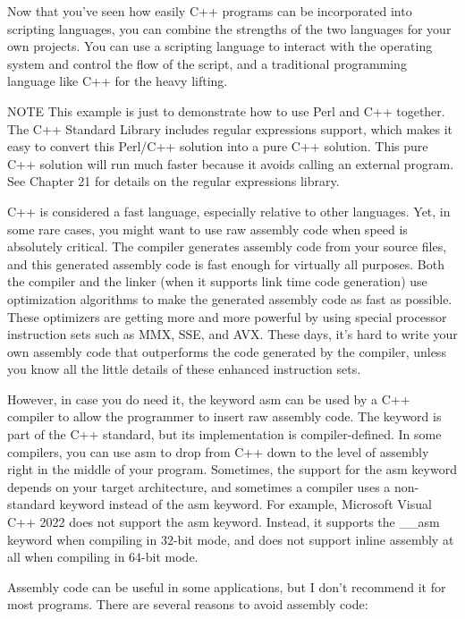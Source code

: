 Now that you’ve seen how easily C++ programs can be incorporated into scripting languages, you can combine the strengths of the two languages for your own projects. You can use a scripting language to interact with the operating system and control the flow of the script, and a traditional programming language like C++ for the heavy lifting.

\begin{myNotic}{NOTE}
This example is just to demonstrate how to use Perl and C++ together. The C++ Standard Library includes regular expressions support, which makes it easy to convert this Perl/C++ solution into a pure C++ solution. This pure C++ solution will run much faster because it avoids calling an external program. See Chapter 21 for details on the regular expressions library.
\end{myNotic}


C++ is considered a fast language, especially relative to other languages. Yet, in some rare cases, you might want to use raw assembly code when speed is absolutely critical. The compiler generates assembly code from your source files, and this generated assembly code is fast enough for virtually all purposes. Both the compiler and the linker (when it supports link time code generation) use optimization algorithms to make the generated assembly code as fast as possible. These optimizers are getting more and more powerful by using special processor instruction sets such as MMX, SSE, and AVX. These days, it’s hard to write your own assembly code that outperforms the code generated by the compiler, unless you know all the little details of these enhanced instruction sets.

However, in case you do need it, the keyword asm can be used by a C++ compiler to allow the programmer to insert raw assembly code. The keyword is part of the C++ standard, but its implementation is compiler-defined. In some compilers, you can use asm to drop from C++ down to the level of assembly right in the middle of your program. Sometimes, the support for the asm keyword depends on your target architecture, and sometimes a compiler uses a non-standard keyword instead of the asm keyword. For example, Microsoft Visual C++ 2022 does not support the asm keyword. Instead, it supports the \_\_asm keyword when compiling in 32-bit mode, and does not support inline assembly at all when compiling in 64-bit mode.

Assembly code can be useful in some applications, but I don’t recommend it for most programs. There are several reasons to avoid assembly code:

